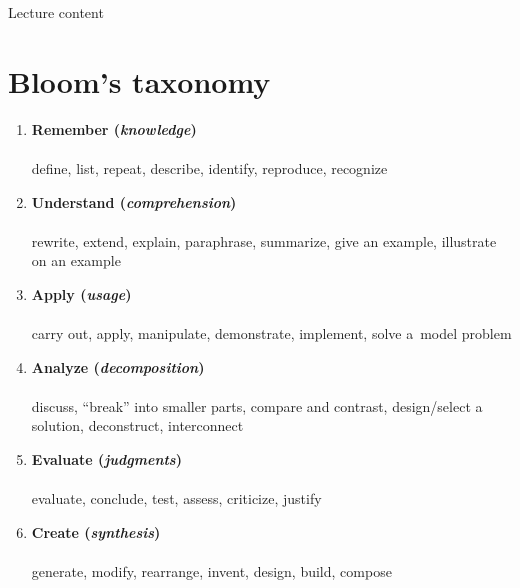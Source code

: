 Lecture content\\

\newpage

\chapter*{Bloom's taxonomy}
\label{bloom}
\vspace{-0.5em}
\vspace{-0.3em}

\begin{enumerate}[leftmargin=*]
\item \textbf{Remember (\textit{knowledge})}\\
\\
{\small define, list, repeat, describe, identify, reproduce, recognize}

\item \textbf{Understand (\textit{comprehension})}\\
\\
{\small rewrite, extend, explain, paraphrase, summarize, give an example, illustrate on an example}

\item \textbf{Apply (\textit{usage})}\\
\\
{\small carry out, apply, manipulate, demonstrate, implement, solve a~model problem}

\item \textbf{Analyze (\textit{decomposition})}\\
\\
{\small discuss, \enquote{break} into smaller parts, compare and contrast, design/select a solution, deconstruct, interconnect}

\item \textbf{Evaluate (\textit{judgments})}\\
\\
{\small evaluate, conclude, test, assess, criticize, justify}

\item \textbf{Create (\textit{synthesis})}\\
\\
{\small generate, modify, rearrange, invent, design, build, compose}
\end{enumerate}

